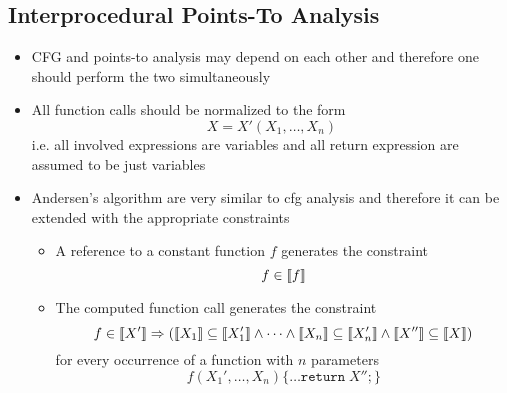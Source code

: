 \subsection{Interprocedural Points-To Analysis}
\begin{itemize}
  \item CFG and points-to analysis may depend on each other and therefore one should perform the two simultaneously
  \item All function calls should be normalized to the form
  \begin{equation*}
    X = X'(X_1, \dots, X_n)
  \end{equation*} 
  i.e. all involved expressions are variables and all return expression are assumed to be just variables
  \item Andersen's algorithm are very similar to cfg analysis and therefore it can be extended with the appropriate constraints
  \begin{itemize}
    \item A reference to a constant function $f$ generates the constraint
    \begin{equation*}
     f \in \left\llbracket f\right\rrbracket 
    \end{equation*} 
    \item The computed function call generates the constraint
    \begin{equation*}
      f \in \left\llbracket X'\right\rrbracket \Rightarrow (\left\llbracket X_1\right\rrbracket \subseteq \left\llbracket X_1'\right\rrbracket \land \cdots \land \left\llbracket X_n\right\rrbracket \subseteq \left\llbracket X_n'\right\rrbracket \land \left\llbracket X''\right\rrbracket \subseteq \left\llbracket X\right\rrbracket)
    \end{equation*}
    for every occurrence of a function with $n$ parameters
    \begin{equation*}
      f(X_1', \dots, X_n) \{\dots \mathtt{return} \; X''; \}
    \end{equation*}
  \end{itemize}
\end{itemize}

